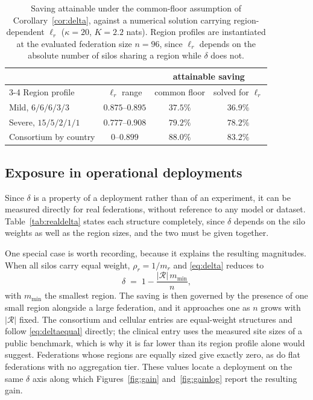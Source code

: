 \documentclass[acmsmall,screen,review,anonymous]{acmart}
\theoremstyle{acmdefinition}%
\newcommand{\Reg}{\mathcal{R}}
\begin{document}
\begin{table}[t]
\caption{Saving attainable under the common-floor assumption of Corollary~\ref{cor:delta}, against a numerical solution carrying region-dependent $\ell_r$ ($\kappa = 20$, $K = 2.2$ nats). Region profiles are instantiated at the evaluated federation size $n = 96$, since $\ell_r$ depends on the absolute number of silos sharing a region while $\delta$ does not.}
\label{tab:ellgap}
\centering
\footnotesize
\setlength{\tabcolsep}{5pt}
\begin{tabular}{@{}lccc@{}}
\toprule
& & \multicolumn{2}{c}{attainable saving} \\
\cmidrule(lr){3-4}
Region profile & $\ell_r$ range & common floor & solved for $\ell_r$ \\
\midrule
Mild, $6/6/6/3/3$ & $0.875$--$0.895$ & $37.5\%$ & $36.9\%$ \\
Severe, $15/5/2/1/1$ & $0.777$--$0.908$ & $79.2\%$ & $78.2\%$ \\
Consortium by country & $0$--$0.899$ & $88.0\%$ & $83.2\%$ \\
\bottomrule
\end{tabular}
\end{table}

\subsection{Exposure in operational deployments}

Since $\delta$ is a property of a deployment rather than of an experiment, it can
be measured directly for real federations, without reference to any model or
dataset. Table~\ref{tab:realdelta} states each structure completely, since
$\delta$ depends on the silo weights as well as the region sizes, and the two must
be given together.

One special case is worth recording, because it explains the resulting
magnitudes. When all silos carry equal weight, $\rho_r = 1/m_r$ and
\eqref{eq:delta} reduces to
\begin{equation}
\delta \;=\; 1 - \frac{|\Reg| \, m_{\min}}{n},
\label{eq:deltaequal}
\end{equation}
with $m_{\min}$ the smallest region. The saving is then governed by the presence
of one small region alongside a large federation, and it approaches one as $n$
grows with $|\Reg|$ fixed. The consortium and cellular entries are equal-weight
structures and follow \eqref{eq:deltaequal} directly; the clinical entry uses the
measured site sizes of a public benchmark, which is why it is far lower than its
region profile alone would suggest. Federations whose regions are equally sized
give exactly zero, as do flat federations with no aggregation tier. These values
locate a deployment on the same $\delta$ axis along which Figures~\ref{fig:gain}
and~\ref{fig:gainlog} report the resulting gain.
\end{document}
